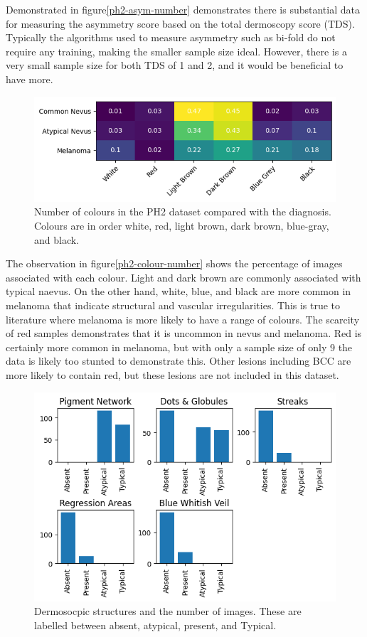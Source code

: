 Demonstrated in figure\ref{ph2-asym-number} demonstrates there is substantial data for measuring the asymmetry score based on the total dermoscopy score (TDS). Typically the algorithms used to measure asymmetry such as bi-fold do not require any training, making the smaller sample size ideal. However, there is a very small sample size for both TDS of 1 and 2, and it would be beneficial to have more.

\begin{figure}
    \centering
    \includegraphics[scale=0.75]{images/ph2/ph2-colour-number-heat.png}
    \caption{Number of colours in the PH2 dataset compared with the diagnosis. Colours are in order white, red, light brown, dark brown, blue-gray, and black.} 
\end{figure}\label{ph2-colour-number}

The observation in figure\ref{ph2-colour-number} shows the percentage of images associated with each colour. Light and dark brown are commonly associated with typical naevus. On the other hand, white, blue, and black are more common in melanoma that indicate structural and vascular irregularities. This is true to literature where melanoma is more likely to have a range of colours. The scarcity of red samples demonstrates that it is uncommon in nevus and melanoma. Red is certainly more common in melanoma, but with only a sample size of only 9 the data is likely too stunted to demonstrate this. Other lesions including BCC are more likely to contain red\cite{}, but these lesions are not included in this dataset.

\begin{figure}
    \centering
    \includegraphics[scale=0.75]{images/ph2/ph2-dermo-number.png}
    \caption{Dermosocpic structures and the number of images. These are labelled between absent, atypical, present, and Typical.} 
\end{figure}\label{ph2-dermo-number}

